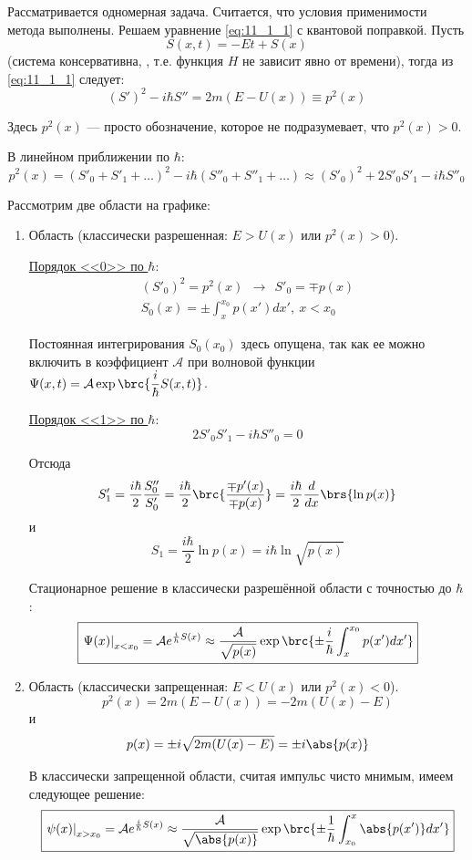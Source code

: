 Рассматривается одномерная задача. Считается, что условия применимости метода выполнены. Решаем уравнение \eqref{eq:11_1_1} с квантовой поправкой. Пусть 
$$
S(x,t) = -Et + S(x)
$$
(система консервативна, , т.е. функция $H$ не зависит явно от времени), тогда из \eqref{eq:11_1_1} следует:
$$
(S')^2 - i\hbar S'' = 2m(E-U(x)) \equiv p^2(x)
$$

Здесь $p^2(x)$ --- просто обозначение, которое не подразумевает, что $p^2(x) > 0$.

В линейном приближении по $\hbar$:
$$
p^2(x) = (S'_0 + S'_1 + \dots)^2 - i\hbar(S''_0+S''_1+\dots) \approx (S'_0)^2 + 2 S'_0 S'_1 - i\hbar S''_0
$$

Рассмотрим две области на графике:
\renewcommand{\labelenumi}{(\alph{enumi})}
\begin{enumerate}
\item Область  (классически разрешенная: $E > U(x)$ или $p^2(x)>0$).

\underline{Порядок <<0>> по $\hbar$}:
$$
\begin{gathered}
(S'_0)^2 = p^2(x) ~~ \rightarrow~~ S'_0 = \mp p(x)\\
\boxed{S_0(x) = \pm \int_x^{x_0} p(x')dx',~ x<x_0}
\end{gathered}
$$

Постоянная интегрирования $S_0(x_0)$ здесь опущена, так как ее можно включить в коэффициент $\mathcal{A}$ при волновой функции $\Psi(x, t) = \mathcal{A} \exp \brc{\dfrac{i}{\hbar} S(x, t)}$.

\underline{Порядок <<1>> по $\hbar$}:
$$
2 S'_0 S'_1 - i\hbar S''_0 = 0
$$

Отсюда
$$
S'_1 = \frac{i\hbar}{2} \frac{S''_0}{S'_0} = \frac{i\hbar}{2} \brc{\frac{\mp p'(x)}{\mp p(x)}} = \frac{i\hbar}{2} \frac{d}{dx}\brs{\ln p(x)}
$$
и
$$
S_1 = \frac{i\hbar}{2} \ln p(x) = \boxed{i\hbar \ln \sqrt{p(x)}}
$$

Стационарное решение в классически разрешённой области с точностью до $\hbar$:
$$
\boxed{\left. \Psi(x) \right|_{x<x_0} = \mathcal{A} e^{\frac{i}{h} S(x)} \approx \frac{\mathcal{A}}{\sqrt{p(x)}} \exp \brc{\pm\frac{i}{\hbar}\int_x^{x_0} p(x')dx'} }
$$

\item Область  (классически запрещенная: $E<U(x)$ или $p^2(x)<0$).
$$
p^2(x) = 2m(E-U(x)) = -2m(U(x)-E)
$$
и
$$
p(x) = \pm i \sqrt{2m(U(x)-E)} = \pm i \abs{p(x)}
$$

В классически запрещенной области, считая импульс чисто мнимым, имеем следующее решение:
$$
\boxed{\left. \psi(x) \right|_{x>x_0} = \mathcal{A} e^{\frac{i}{\hbar} S(x)} \approx \frac{\mathcal{A}}{\sqrt{\abs{p(x)}}} \exp \brc{\pm\frac{1}{\hbar}\int_{x_0}^{x} \abs{p(x')}dx'} }
$$
\end{enumerate}

